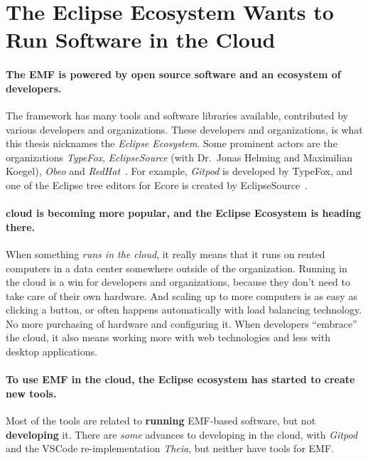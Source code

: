 \section{The Eclipse Ecosystem Wants to Run Software in the Cloud}\label{sec:intro-eclipse-cloud}

\paragraph{The \acrlong{EMF} is powered by \gls{open source} software and an ecosystem of developers.}
The framework has many tools and software libraries available, contributed by various developers and organizations.
These developers and organizations, is what this thesis nicknames the \textit{Eclipse Ecosystem}.
Some prominent actors are the organizations \textit{TypeFox}, \textit{EclipseSource} (with Dr.\ Jonas Helming and Maximilian Koegel), \textit{Obeo} and \textit{RedHat}~\cite{rekstadModelingEnvironmentCloud2020}.
For example, \textit{\gls{Gitpod}} is developed by TypeFox, and one of the \gls{Eclipse} tree editors for \gls{Ecore} is created by EclipseSource~\cite{typefoxTypeFoxSmartTools,eclipsesourceEMFFormsEditors2016}.

\paragraph{\Gls{cloud} is becoming more popular, and the Eclipse Ecosystem is heading there.}
When something \textit{runs in the \gls{cloud}}, it really means that it runs on rented computers in a data center somewhere outside of the organization.
Running in the cloud is a win for developers and organizations, because they don't need to take care of their own hardware.
And scaling up to more computers is as easy as clicking a button, or often happens automatically with load balancing technology.
No more purchasing of hardware and configuring it.
When developers ``embrace'' the \gls{cloud}, it also means working more with web technologies and less with desktop applications.

\paragraph{To use \acrshort{EMF} in the cloud, the Eclipse ecosystem has started to create new tools.}
Most of the tools are related to \textbf{running} \acrshort{EMF}-based software, but not \textbf{developing} it.
There are \textit{some} advances to developing in the cloud, with \textit{Gitpod} and the \gls{VSCode} re-implementation \textit{\gls{Theia}}, but neither have tools for \acrshort{EMF}.


